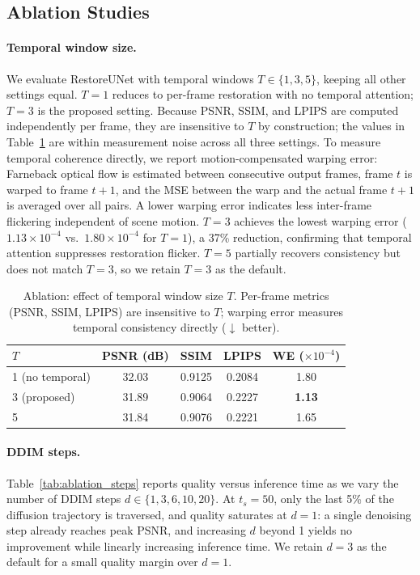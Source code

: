 \documentclass[10pt, conference]{IEEEtran}
\begin{document}
\subsection{Ablation Studies}

\paragraph{Temporal window size.}
We evaluate RestoreUNet with temporal windows $T \in \{1, 3, 5\}$, keeping all other settings equal. $T{=}1$ reduces to per-frame restoration with no temporal attention; $T{=}3$ is the proposed setting. Because PSNR, SSIM, and LPIPS are computed independently per frame, they are insensitive to $T$ by construction; the values in Table~\ref{tab:ablation_T} are within measurement noise across all three settings. To measure temporal coherence directly, we report motion-compensated warping error: Farneback optical flow is estimated between consecutive output frames, frame $t$ is warped to frame $t{+}1$, and the MSE between the warp and the actual frame $t{+}1$ is averaged over all pairs. A lower warping error indicates less inter-frame flickering independent of scene motion. $T{=}3$ achieves the lowest warping error ($1.13 \times 10^{-4}$ vs.\ $1.80 \times 10^{-4}$ for $T{=}1$), a 37\% reduction, confirming that temporal attention suppresses restoration flicker. $T{=}5$ partially recovers consistency but does not match $T{=}3$, so we retain $T{=}3$ as the default.

\begin{table}[t]
\centering
\caption{Ablation: effect of temporal window size $T$. Per-frame metrics (PSNR, SSIM, LPIPS) are insensitive to $T$; warping error measures temporal consistency directly ($\downarrow$ better).}
\label{tab:ablation_T}
\begin{tabular}{lcccc}
\toprule
$T$ & PSNR (dB) & SSIM & LPIPS & WE ($\times10^{-4}$) \\
\midrule
1 (no temporal) & 32.03 & 0.9125 & 0.2084 & 1.80 \\
3 (proposed)    & 31.89 & 0.9064 & 0.2227 & \textbf{1.13} \\
5               & 31.84 & 0.9076 & 0.2221 & 1.65 \\
\bottomrule
\end{tabular}
\end{table}

\paragraph{DDIM steps.}
Table~\ref{tab:ablation_steps} reports quality versus inference time as we vary the number of DDIM steps $d \in \{1, 3, 6, 10, 20\}$. At $t_s{=}50$, only the last 5\% of the diffusion trajectory is traversed, and quality saturates at $d{=}1$: a single denoising step already reaches peak PSNR, and increasing $d$ beyond 1 yields no improvement while linearly increasing inference time. We retain $d{=}3$ as the default for a small quality margin over $d{=}1$.
\end{document}
